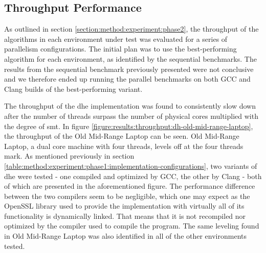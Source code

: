 
\subsection{Throughput Performance}

As outlined in section \ref{section:method:experiment:phase2}, the throughput of the algorithms in each environment under test was evaluated for a series of parallelism configurations. The initial plan was to use the best-performing algorithm for each environment, as identified by the sequential benchmarks. The results from the sequential benchmark previously presented were not conclusive and we therefore ended up running the parallel benchmarks on both GCC and Clang builds of the best-performing variant.

The throughput of the \gls{dhe} implementation was found to consistently slow down after the number of threads surpass the number of physical cores multiplied with the degree of \gls{smt}. In figure \ref{figure:results:throughput:dh-old-mid-range-laptop}, the throughput of the Old Mid-Range Laptop can be seen. Old Mid-Range Laptop, a dual core machine with four threads, levels off at the four threads mark. As mentioned previously in section \ref{table:method:experiment:phase1:implementation-configurations}, two variants of \gls{dhe} were tested - one compiled and optimized by GCC, the other by Clang - both of which are presented in the aforementioned figure. The performance difference between the two compilers seem to be negligible, which one may expect as the OpenSSL library used to provide the implementation with virtually all of its functionality is dynamically linked. That means that it is not recompiled nor optimized by the compiler used to compile the program. The same leveling found in Old Mid-Range Laptop was also identified in all of the other environments tested.

